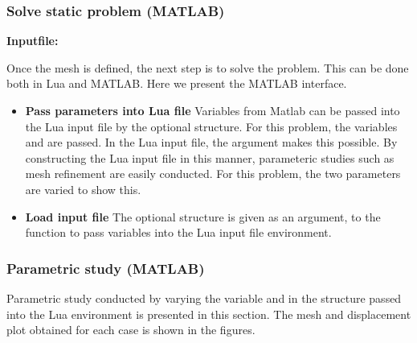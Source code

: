 \clearpage
\subsubsection*{Solve static problem (MATLAB)}
\begin{flushleft}
  \textbf{Inputfile:}
  \\
\end{flushleft}
\hspace{1in}
{\footnotesize
{}
}

\clearpage
Once the mesh is defined, the next step is to solve the problem.
This can be done both in Lua and MATLAB. Here we present the MATLAB
interface. 

\begin{itemize}

  \item{\textbf{Pass parameters into Lua file}}
  Variables from Matlab can be passed into the Lua input file
  by the optional  structure. For this problem, the
  variables  and  are passed. In the
  Lua input file, the  argument makes this possible. 
  By constructing the Lua input file in this manner, parameteric
  studies such as mesh refinement are easily conducted. For this
  problem, the two parameters are varied to show this. 

  \item{\textbf{Load input file}}
  The optional structure  is given as an argument,
  to the function 
  to pass variables into the Lua input file environment.

\end{itemize}

\clearpage
\subsubsection*{Parametric study (MATLAB)}
Parametric study conducted by varying the variable 
 and  in the structure 
passed into the Lua environment is presented in this
section. The mesh and displacement plot obtained for each case
is shown in the figures.

